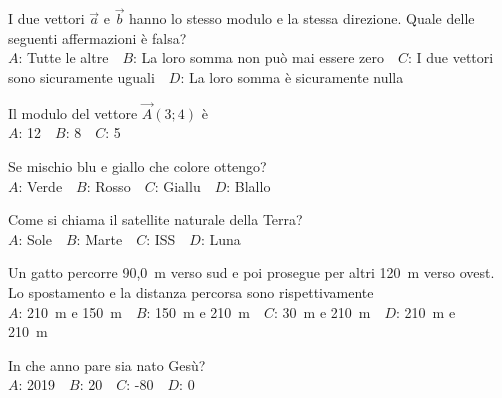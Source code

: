 \mcquestionfooter



\def\mcquestionnumber{11}


\mcquestionheader I due vettori $\vec{a}$ e $\vec{b}$ hanno lo stesso modulo e la stessa direzione. Quale delle seguenti affermazioni è falsa?\\
{$A$}: Tutte le altre\ \ {$B$}: La loro somma non può mai essere zero\ \ {$C$}: I due vettori sono sicuramente uguali\ \ {$D$}: La loro somma è sicuramente nulla\ \ 

\mcquestionfooter



\def\mcquestionnumber{12}


\mcquestionheader Il modulo del vettore $\vec{A}(3;4)$ è\\
{$A$}: 12\ \ {$B$}: 8\ \ {$C$}: 5\ \ 

\mcquestionfooter



\mcpaperfooter

\def\mcserialnumber{13}
\mcpaperheader


\def\mcquestionnumber{1}


\mcquestionheader Se mischio blu e giallo che colore ottengo?\\
{$A$}: Verde\ \ {$B$}: Rosso\ \ {$C$}: Giallu\ \ {$D$}: Blallo\ \ 

\mcquestionfooter



\def\mcquestionnumber{2}


\mcquestionheader Come si chiama il satellite naturale della Terra?\\
{$A$}: Sole\ \ {$B$}: Marte\ \ {$C$}: ISS\ \ {$D$}: Luna\ \ 

\mcquestionfooter



\def\mcquestionnumber{3}


\mcquestionheader Un gatto percorre 90,0~m verso sud e poi prosegue per altri 120~m verso ovest. Lo spostamento e la distanza percorsa sono rispettivamente\\
{$A$}: 210~m e 150~m\ \ {$B$}: 150~m e 210~m\ \ {$C$}: 30~m e 210~m\ \ {$D$}: 210~m e 210~m\ \ 

\mcquestionfooter



\def\mcquestionnumber{4}


\mcquestionheader In che anno pare sia nato Gesù?\\
{$A$}: 2019\ \ {$B$}: 20\ \ {$C$}: -80\ \ {$D$}: 0\ \ 

